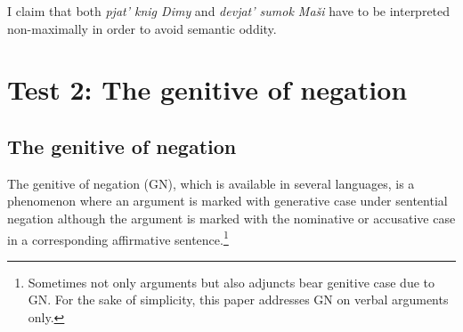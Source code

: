 \documentclass[output=paper,
colorlinks,
citecolor=brown,
newtxmath
]{langscibook}
\begin{document}
\noindent I claim that both \textit{pjat' knig Dimy} and \textit{devjat' sumok Maši} have to be interpreted non-maximally in order to avoid semantic oddity.

\section{Test 2: The genitive of negation}\label{secGN}

\subsection{The genitive of negation}

The genitive of negation (GN), which is available in several  languages, is a phenomenon where an argument is marked with generative case under sentential negation although the argument is marked with the nominative or accusative case in a corresponding affirmative sentence.\footnote{Sometimes not only arguments but also adjuncts bear genitive case due to GN. For the sake of simplicity, this paper addresses GN on verbal arguments only.}
\end{document}

